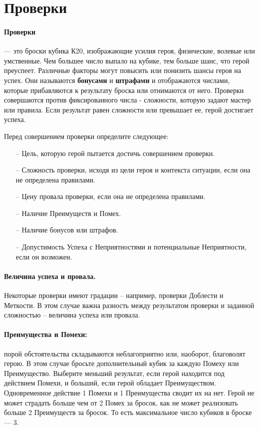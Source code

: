 \section{Проверки}
\paragraph{Проверки} — это броски кубика К20, изображающие усилия героя, физические, волевые или умственные. Чем большее число выпало на кубике, тем больше шанс, что герой преуспеет. Различные факторы могут повысить или понизить шансы героя на успех. Они называются \textbf{бонусами} и \textbf{штрафами} и отображаются числами, которые прибавляются к результату броска или отнимаются от него.
\newline Проверки совершаются против фиксированного числа - сложности, которую задают мастер или правила. Если результат равен сложности или превышает ее, герой достигает успеха.

Перед совершением проверки определите следующее:
\begin{itemize}
\item[--]Цель, которую герой пытается достичь совершением проверки.
\item[--]Сложность проверки, исходя из цели героя и контекста
ситуации, если она не определена правилами.
\item[--]Цену провала проверки, если она не определена правилами.
\item[--]Наличие Преимуществ и Помех.
\item[--]Наличие бонусов или штрафов.
\item[--]Допустимость Успеха с Неприятностями и потенциальные Неприятности, если он возможен.
\end{itemize}
\paragraph{Величина успеха и провала.} Некоторые проверки имеют градации – например, проверки Доблести и Меткости. В этом случае важна разность между результатом проверки и заданной сложностью – величина успеха или провала.

\paragraph{Преимущества и Помехи:} порой обстоятельства складываются неблагоприятно или, наоборот, благоволят герою. В этом случае бросьте дополнительный кубик за каждую Помеху или Преимущество. Выберите меньший результат, если герой находится под действием Помехи, и больший, если герой обладает Преимуществом. Одновременное действие 1 Помехи и 1 Преимущества сводит их на нет. 
\newline Герой не может страдать больше чем от 2 Помех за бросок, как не может реализовать больше 2 Преимуществ за бросок. То есть максимальное число кубиков в броске — 3.
